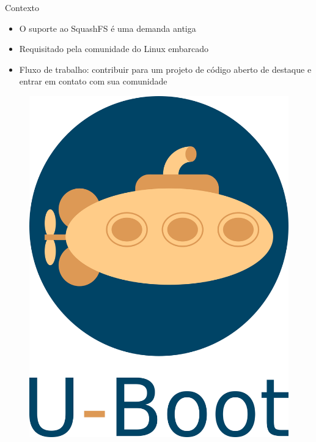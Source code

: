 \begin{frame}{Contexto}
\begin{center}
\begin{itemize}
    \item O suporte ao SquashFS é uma demanda antiga
    \item Requisitado pela comunidade do Linux embarcado
    \item Fluxo de trabalho: contribuir para um projeto de código aberto de destaque e entrar em contato com sua comunidade
\end{itemize}    

\begin{figure}
    \centering
    \includegraphics[scale=0.06]{figuras/uboot_logo.png}
    \label{fig:my_label}
\end{figure}
\end{center}
\end{frame}

